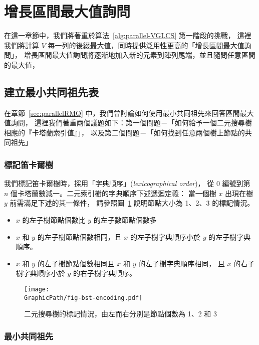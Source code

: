 \section{增長區間最大值詢問} \label{sec:QIUD}

在這一章節中，我們將著重於算法~\ref{alg:parallel-VGLCS} 第一階段的挑戰，
這裡我們將計算 $V$ 每一列的後綴最大值，同時提供泛用性更高的「增長區間最大值詢問」，
增長區間最大值詢問將逐漸地加入新的元素到陣列尾端，並且隨問任意區間的最大值，

\subsection{建立最小共同祖先表}

在章節~\ref{sec:parallelRMQ} 中，我們曾討論如何使用最小共同祖先來回答區間最大值詢問，
這裡我們著重兩個議題如下：第一個問題－「如何給予一個二元搜尋樹相應的『卡塔蘭索引值』」，
以及第二個問題－「如何找到任意兩個樹上節點的共同祖先」

\subsubsection{標記笛卡爾樹}

我們標記笛卡爾樹時，採用「字典順序」({\em lexicographical order})，
從 $0$ 編號到第 $n$ 個卡塔蘭數減一。二元索引樹的字典順序下述遞迴定義：
當一個樹 $x$ 出現在樹 $y$ 前需滿足下述的其一條件，
請參照圖~\ref{fig:labelingBST} 說明節點大小為 1、2、3 的標記情況。

\begin{itemize}
\item $x$ 的左子樹節點個數比 $y$ 的左子數節點個數多
\item $x$ 和 $y$ 的左子樹節點個數相同，且 $x$ 的左子樹字典順序小於 $y$ 的左子樹字典順序。
\item $x$ 和 $y$ 的左子樹節點個數相同且 $x$ 和 $y$ 的左子樹字典順序相同，
  且 $x$ 的右子樹字典順序小於 $y$ 的右子樹字典順序。
\end{itemize}

\begin{figure}[!thb]
  \centering
  \texttt{[image: \\GraphicPath/fig-bst-encoding.pdf]}
  \caption{二元搜尋樹的標記情況，由左而右分別是節點個數為 1、2 和 3}
  \label{fig:labelingBST}
\end{figure}

\subsubsection{最小共同祖先}

